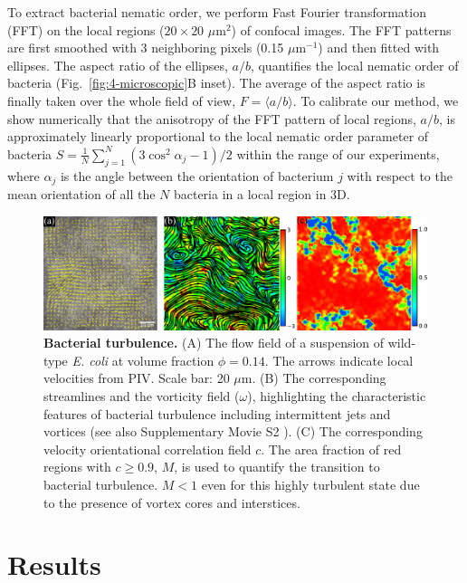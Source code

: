 To extract bacterial nematic order, we perform Fast Fourier transformation (FFT) on the local regions ($20 \times 20$ $\mu$m$^2$) of confocal images.
The FFT patterns are first smoothed with 3 neighboring pixels (0.15 $\mu$m$^{-1}$) and then fitted with ellipses. The aspect ratio of the ellipses, $a/b$, quantifies the local nematic order of bacteria (Fig.~\ref{fig:4-microscopic}B inset).
The average of the aspect ratio is finally taken over the whole field of view, $F = \langle a/b \rangle$. To calibrate our method, we show numerically that the anisotropy of the FFT pattern of local regions, $a/b$, is approximately linearly proportional to the local nematic order parameter of bacteria $S=\frac{1}{N}\sum_{j=1}^N(3\cos^2\alpha_j - 1)/2$ within the range of our experiments, where $\alpha_j$ is the angle between the orientation of bacterium $j$ with respect to the mean orientation of all the $N$ bacteria in a local region in 3D.

\begin{figure}[!ht]
	\begin{center}
	\includegraphics[width=5.5 in]{Figs/4-Emergence/1.pdf}
	\end{center}
	\caption[Bacterial turbulence]
	{
	\textbf{Bacterial turbulence.}
  (A) The flow field of a suspension of wild-type \textit{E. coli} at volume fraction $\phi=0.14$. The arrows indicate local velocities from PIV. Scale bar: 20 $\mu$m.
  (B) The corresponding streamlines and the vorticity field ($\omega$), highlighting the characteristic features of bacterial turbulence including intermittent jets and vortices (see also Supplementary Movie S2 \cite{suppMovies}).
  (C) The corresponding velocity orientational correlation field $c$. The area fraction of red regions with $c \ge 0.9$, $M$, is used to quantify the transition to bacterial turbulence. $M < 1$ even for this highly turbulent state due to the presence of vortex cores and interstices.
	}
	\label{fig:4-turbulence}
\end{figure}

\section{Results}

